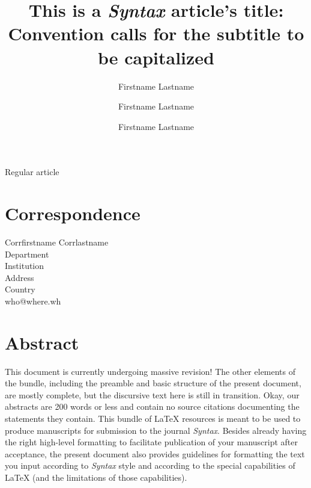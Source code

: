 \documentclass[letterpaper,12pt, twoside]{article}
\begin{document}
\noindent Regular article

\title{This is a \emph{Syntax} article's title: Convention calls for the subtitle to be capitalized}




\author[1]{Firstname Lastname}
\author[2]{Firstname Lastname}
\author[1]{Firstname Lastname}





\maketitle
\runninghead


\section*{Correspondence}
\begin{flushleft}
Corrfirstname Corrlastname \\ Department \\ Institution \\ Address \\ Country \\  who@where.wh
\end{flushleft}


\section*{Abstract}
This document is currently undergoing massive revision! The other elements of the bundle, including the preamble and basic structure of the present document, are mostly complete, but the discursive text here is still in transition. Okay, our abstracts are 200 words or less and contain no source citations documenting the statements they contain. This bundle of LaTeX resources is meant to be used to produce manuscripts for submission to the journal \emph{Syntax}. Besides already having the right high-level formatting to facilitate publication of your manuscript after acceptance, the present document also provides guidelines for formatting the text you input according to \emph{Syntax} style and according to the special capabilities of LaTeX (and the limitations of those capabilities). 
\end{document}
